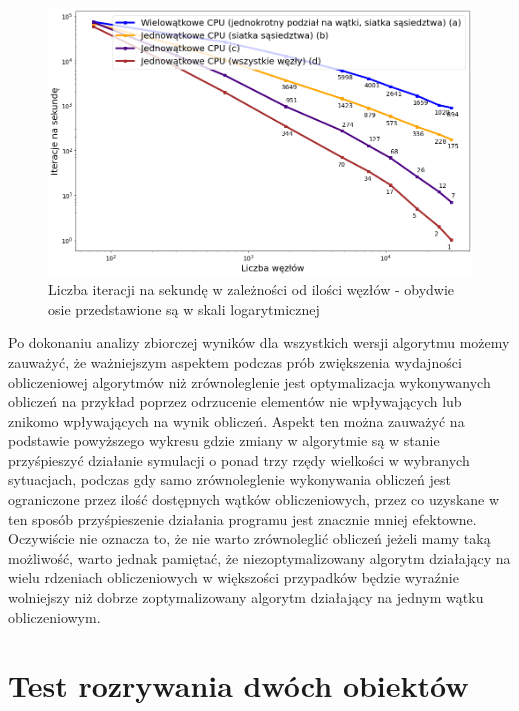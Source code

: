 \documentclass[12pt, letterpaper]{report}
\begin{document}
    \begin{figure}[H]
        \centering
        \includegraphics[width=18cm]{performance_all_best_worst_log_log.png}
        \caption{
            Liczba iteracji na sekundę w zależności od ilości węzłów - 
            obydwie osie przedstawione są w skali logarytmicznej
        }
    \end{figure}

    Po dokonaniu analizy zbiorczej wyników dla wszystkich wersji algorytmu możemy zauważyć, że
    ważniejszym aspektem podczas prób zwiększenia wydajności obliczeniowej algorytmów niż zrównoleglenie 
    jest optymalizacja wykonywanych obliczeń na przykład poprzez odrzucenie elementów nie wpływających 
    lub znikomo wpływających na wynik obliczeń. Aspekt ten można zauważyć na podstawie powyższego wykresu
    gdzie zmiany w algorytmie są w stanie przyśpieszyć działanie symulacji o ponad trzy rzędy wielkości w
    wybranych sytuacjach, podczas gdy samo zrównoleglenie wykonywania obliczeń jest ograniczone przez
    ilość dostępnych wątków obliczeniowych, przez co uzyskane w ten sposób przyśpieszenie działania 
    programu jest znacznie mniej efektowne. \\
    
    Oczywiście nie oznacza to, że nie warto zrównoleglić obliczeń
    jeżeli mamy taką możliwość, warto jednak pamiętać, że niezoptymalizowany algorytm działający 
    na wielu rdzeniach obliczeniowych w większości przypadków będzie wyraźnie wolniejszy niż dobrze
    zoptymalizowany algorytm działający na jednym wątku obliczeniowym.

    \clearpage
    \section{Test rozrywania dwóch obiektów}
\end{document}
